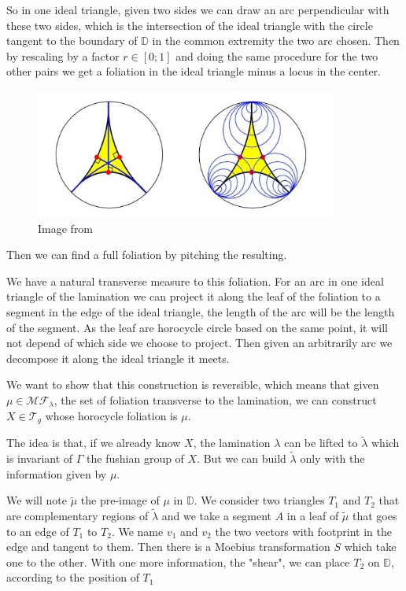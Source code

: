 So in one ideal triangle, given two sides we can draw an arc perpendicular with these two sides, which is the intersection of the ideal triangle with the circle tangent to the boundary of $\mathbb{D}$ in the common extremity the two arc chosen. Then by rescaling by a factor $r \in [0;1]$ and doing the same procedure for the two other pairs we get a foliation in the ideal triangle minus a locus in the center.


\begin{figure}[h!]
\centering
\includegraphics[width=10cm]{Image/FoliationTri.jpg}
\caption{Image from \cite{Martelli2016AnIT}}
\end{figure}

Then we can find a full foliation by pitching the resulting.

We have a natural transverse measure to this foliation. For an arc in one ideal triangle of the lamination we can project it along the leaf of the foliation to a segment in the edge of the ideal triangle, the length of the arc will be the length of the segment. As the leaf are horocycle circle based on the same point, it will not depend of which side we choose to project. Then given an arbitrarily arc we decompose it along the ideal triangle it meets.

We want to show that this construction is reversible, which means that given $\mu \in \mathcal{MF}_\lambda $, the set of foliation transverse to the lamination, we can
construct $X \in \mathcal{T}_g$ whose horocycle foliation is $\mu$.

The idea is that, if we already know $X$, the lamination $\lambda$ can be lifted to $\tilde{\lambda}$ which is invariant of $\Gamma$ the fushian group of $X$. But we can build $\tilde{\lambda}$ only with the information given by $\mu$.

We will note $\tilde{\mu}$ the pre-image of $\mu$ in $\mathbb{D}$. We consider two triangles $T_1$ and $T_2$ that are complementary regions of $\tilde{\lambda}$ and we take a segment $A$ in a leaf of $\tilde{\mu}$ that goes to an edge of $T_1$ to $T_2$. We name $v_1$ and $v_2$ the two vectors with footprint in the edge and tangent to them. Then there is a Moebius transformation $S$ which take one to the other. With one more information, the "shear", we can place $T_2$ on $\mathbb{D}$, according to the position of $T_1$

